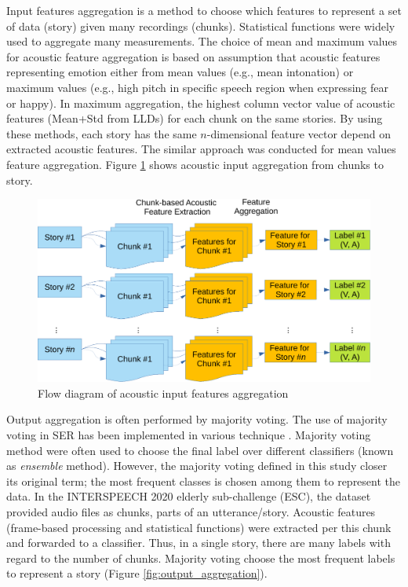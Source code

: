 Input features aggregation is a method to choose which features to represent a
set of data (story) given many recordings (chunks). Statistical functions were
widely used to aggregate many measurements. The choice of mean and maximum
values for acoustic feature aggregation is based on assumption that acoustic
features representing emotion either from mean values (e.g., mean intonation)
or maximum values (e.g., high pitch in specific speech region when expressing
fear or happy). In maximum aggregation, the highest column vector value of
acoustic features (Mean+Std from LLDs) for each chunk on the same stories. By
using these methods, each story has the same $n$-dimensional feature
vector depend on extracted acoustic features. The similar approach was
conducted for mean values feature aggregation. Figure
\ref{fig:input_aggregation} shows acoustic input aggregation from chunks to
story. 

\begin{figure}[htbp]
  \centering
  \includegraphics[width=.7\textwidth]{../fig/feature_aggregation-crop.pdf}
  \caption{Flow diagram of acoustic input features aggregation}
  \label{fig:input_aggregation}
\end{figure}

Output aggregation is often performed by majority voting. The use of majority
voting in SER has been implemented in various technique \cite{Sezgin2012,
Elbarougy2019}. Majority voting method were often used to choose the final
label over different classifiers (known as \textit{ensemble} method). However,
the majority voting defined in this study closer its original term; the most
frequent classes is chosen among them to represent the data. In the INTERSPEECH
2020 elderly sub-challenge (ESC), the dataset provided audio files as chunks,
parts of an utterance/story. Acoustic features (frame-based processing and
statistical functions) were extracted per this chunk and forwarded to a
classifier. Thus, in a single story, there are many labels with regard to the
number of chunks. Majority voting choose the most frequent labels to represent
a story (Figure \ref{fig:output_aggregation}).

